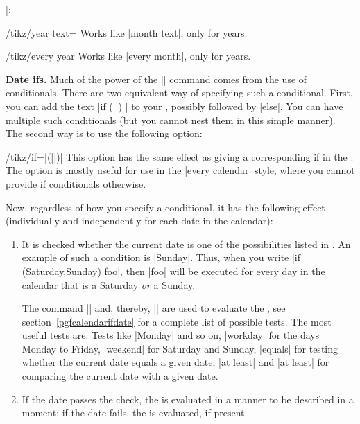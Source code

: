 \begin{command}{\calendar {}|;|}
    \begin{key}{/tikz/year text=}
        Works like |month text|, only for years.
    \end{key}


    \begin{key}{/tikz/every year}
        Works like |every month|, only for years.
    \end{key}


    \medskip
    \textbf{Date ifs.}
    Much of the power of the |\calendar| command comes from the use of
    conditionals. There are two equivalent way of specifying such a
    conditional. First, you can add the text
    |if (||) | to your , possibly followed by |else|. You
    can have multiple such conditionals (but you cannot nest them in this
    simple manner). The second way is to use the following option:
    \begin{key}{/tikz/if=|(||)|}
        This option has the same effect as giving a corresponding if in the
        . The option is mostly useful for use in
        the |every calendar| style, where you cannot provide if conditionals
        otherwise.
    \end{key}
    Now, regardless of how you specify a conditional, it has the following
    effect (individually and independently for each date in the calendar):
    \begin{enumerate}
        \item It is checked whether the current date is one of the
            possibilities listed in . An example of such a
            condition is |Sunday|. Thus, when you write
            |if (Saturday,Sunday) {foo}|, then |foo| will be executed for every
            day in the calendar that is a Saturday \emph{or} a Sunday.

            The command |\ifdate| and, thereby, |\pgfcalendarifdate| are used
            to evaluate the , see
            section~\ref{pgfcalendarifdate} for a complete list of possible
            tests. The most useful tests are: Tests like |Monday| and so on,
            |workday| for the days Monday to Friday, |weekend| for Saturday and
            Sunday, |equals| for testing whether the current date equals a
            given date, |at least| and |at least| for comparing the current
            date with a given date.
        \item If the date passes the check, the  is
            evaluated in a manner to be described in a moment; if the date
            fails, the  is evaluated, if present.


\end{enumerate}
\end{command}
